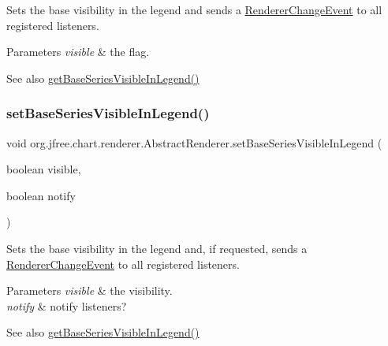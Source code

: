 Sets the base visibility in the legend and sends a \mbox{\hyperlink{}{Renderer\+Change\+Event}} to all registered listeners.


\begin{DoxyParams}{Parameters}
{\em visible} & the flag.\\
\hline
\end{DoxyParams}
\begin{DoxySeeAlso}{See also}
\mbox{\hyperlink{classorg_1_1jfree_1_1chart_1_1renderer_1_1_abstract_renderer_a5657ff754b9ff9dc13bac6349ab43012}{get\+Base\+Series\+Visible\+In\+Legend()}} 
\end{DoxySeeAlso}
\mbox{\label{classorg_1_1jfree_1_1chart_1_1renderer_1_1_abstract_renderer_a2c9f61e4ce08e12f6f4de7d354da3490}} 
\subsubsection{\texorpdfstring{set\+Base\+Series\+Visible\+In\+Legend()}{setBaseSeriesVisibleInLegend()}\hspace{0.1cm}{\footnotesize\ttfamily [2/2]}}
{\footnotesize\ttfamily void org.\+jfree.\+chart.\+renderer.\+Abstract\+Renderer.\+set\+Base\+Series\+Visible\+In\+Legend (\begin{DoxyParamCaption}\item[{boolean}]{visible,  }\item[{boolean}]{notify }\end{DoxyParamCaption})}

Sets the base visibility in the legend and, if requested, sends a \mbox{\hyperlink{}{Renderer\+Change\+Event}} to all registered listeners.


\begin{DoxyParams}{Parameters}
{\em visible} & the visibility. \\
\hline
{\em notify} & notify listeners?\\
\hline
\end{DoxyParams}
\begin{DoxySeeAlso}{See also}
\mbox{\hyperlink{classorg_1_1jfree_1_1chart_1_1renderer_1_1_abstract_renderer_a5657ff754b9ff9dc13bac6349ab43012}{get\+Base\+Series\+Visible\+In\+Legend()}} 
\end{DoxySeeAlso}
\mbox{\label{classorg_1_1jfree_1_1chart_1_1renderer_1_1_abstract_renderer_af60c105686a1d89902ed4897bdfe8e59}} 
